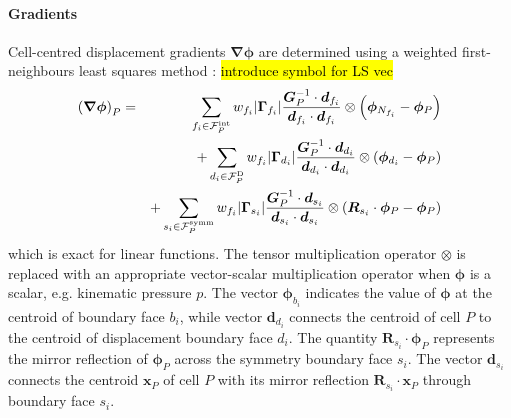 \documentclass[sn-mathphys,Numbered]{sn-jnl}%
\newcommand{\bb}{\boldsymbol}
\begin{document}
\paragraph{Gradients}
Cell-centred displacement gradients $\bb{\nabla} \bb{\phi}$ are determined using a weighted first-neighbours least squares method \citep{Cardiff2025JFNK, Jasak1996}: \hl{introduce symbol for LS vec}
\begin{eqnarray} \label{eq:leastSquaresGrad}
	\left(\bb{\nabla}\bb{\phi}\right)_P
		&=&\sum_{f_i \in \mathcal{F}^{\text{int}}_P} w_{f_i} |\bb{\Gamma}_{f_i}| \frac{\bb{G}^{-1}_P \cdot \bb{d}_{f_i}}{\bb{d}_{f_i} \cdot \bb{d}_{f_i}}  \otimes \left(\bb{\phi}_{N_{f_i}} - \bb{\phi}_P \right) \notag \\
		&&+ \sum_{d_i \in \mathcal{F}^{\text{D}}_P} w_{f_i} |\bb{\Gamma}_{d_i}| \frac{ \bb{G}^{-1}_P \cdot \bb{d}_{d_i} }{\bb{d}_{d_i} \cdot \bb{d}_{d_i}} \otimes \left(\bb{\phi}_{d_i} - \bb{\phi}_P \right) \notag \\
		&&+ \sum_{s_i \in \mathcal{F}^{\text{symm}}_P} w_{f_i} |\bb{\Gamma}_{s_i}| \frac{\bb{G}^{-1}_P \cdot \bb{d}_{s_i}}{\bb{d}_{s_i} \cdot \bb{d}_{s_i}} \otimes \left(\bb{R}_{s_i} \cdot \bb{\phi}_P - \bb{\phi}_P \right)
\end{eqnarray}
which is exact for linear functions.
The tensor multiplication operator $\otimes$ is replaced with an appropriate vector-scalar multiplication operator when $\bb{\phi}$ is a scalar, e.g. kinematic pressure $p$.
The vector $\bb{\phi}_{b_i}$ indicates the value of $\bb{\phi}$ at the centroid of boundary face ${b_i}$, while vector $\bb{d}_{d_i}$ connects the centroid of cell $P$ to the centroid of displacement boundary face $d_i$.
The quantity $\bb{R}_{s_i} \cdot \bb{\phi}_P$ represents the mirror reflection of $\bb{\phi}_P$ across the symmetry boundary face $s_i$.
The vector $\bb{d}_{s_i}$ connects the centroid $\bb{x}_P$ of cell $P$ with its mirror reflection $\bb{R}_{s_i}  \cdot \bb{x}_P$ through boundary face $s_i$.
\end{document}
